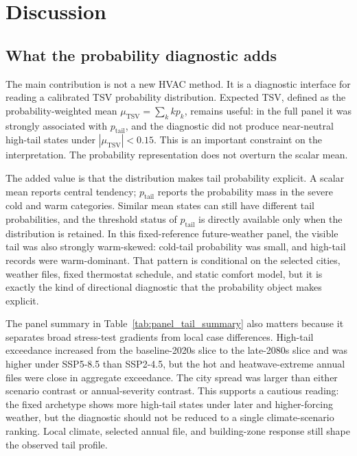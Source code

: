 \section{Discussion}\label{discuss}

\subsection{What the probability diagnostic adds}

The main contribution is not a new HVAC method. It is a diagnostic interface for reading a calibrated TSV probability distribution. Expected TSV, defined as the probability-weighted mean $\mu_{\mathrm{TSV}}=\sum_k k p_k$, remains useful: in the full panel it was strongly associated with $p_{\mathrm{tail}}$, and the diagnostic did not produce near-neutral high-tail states under $|\mu_{\mathrm{TSV}}|<0.15$. This is an important constraint on the interpretation. The probability representation does not overturn the scalar mean.

The added value is that the distribution makes tail probability explicit. A scalar mean reports central tendency; $p_{\mathrm{tail}}$ reports the probability mass in the severe cold and warm categories. Similar mean states can still have different tail probabilities, and the threshold status of $p_{\mathrm{tail}}$ is directly available only when the distribution is retained. In this fixed-reference future-weather panel, the visible tail was also strongly warm-skewed: cold-tail probability was small, and high-tail records were warm-dominant. That pattern is conditional on the selected cities, weather files, fixed thermostat schedule, and static comfort model, but it is exactly the kind of directional diagnostic that the probability object makes explicit.

The panel summary in Table~\ref{tab:panel_tail_summary} also matters because it separates broad stress-test gradients from local case differences. High-tail exceedance increased from the baseline-2020s slice to the late-2080s slice and was higher under SSP5-8.5 than SSP2-4.5, but the hot and heatwave-extreme annual files were close in aggregate exceedance. The city spread was larger than either scenario contrast or annual-severity contrast. This supports a cautious reading: the fixed archetype shows more high-tail states under later and higher-forcing weather, but the diagnostic should not be reduced to a single climate-scenario ranking. Local climate, selected annual file, and building-zone response still shape the observed tail profile.

